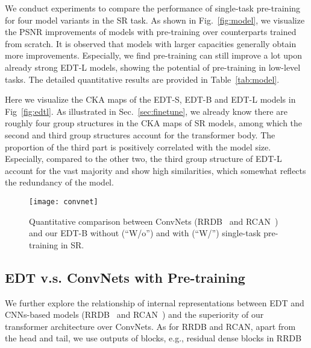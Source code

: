 \documentclass[runningheads]{llncs}
\makeatletter
\newcommand*{\eg}{e.g.\@\xspace}
\makeatother
\begin{document}
We conduct experiments to compare the performance of single-task pre-training for four model variants in the  SR task. As shown in Fig.~\ref{fig:model}, we visualize the PSNR improvements of models with pre-training over counterparts trained from scratch. It is observed that models with larger capacities generally obtain more improvements. Especially, we find pre-training can still improve a lot upon already strong EDT-L models, showing the potential of pre-training in low-level tasks. The detailed quantitative results are provided in Table~\ref{tab:model}.
	
	Here we visualize the CKA maps of the EDT-S, EDT-B and EDT-L models in Fig~\ref{fig:edtl}. As illustrated in Sec.~\ref{sec:finetune}, we already know there are roughly four group structures in the CKA maps of SR models, among which the second and third group structures account for the transformer body. The proportion of the third part is positively correlated with the model size. Especially, compared to the other two, the third group structure of EDT-L account for the vast majority and show high similarities, which somewhat reflects the redundancy of the model.
	


	\begin{figure}[t]
		\begin{center}
			\texttt{[image: convnet]}
		\end{center}
		\vspace{-0.1in}
		\caption{Quantitative comparison between ConvNets (RRDB~\cite{wang2018esrgan} and RCAN~\cite{zhang2018image}) and our EDT-B without (``W/o'') and with (``W/'') single-task pre-training in  SR.}
		\label{fig:convnet}
		\vspace{-0.1in}
	\end{figure}
	
	\subsection{EDT v.s. ConvNets with Pre-training}
	


	We further explore the relationship of internal representations between EDT and CNNs-based models (RRDB~\cite{wang2018esrgan} and RCAN~\cite{zhang2018image}) and the superiority of our transformer architecture over ConvNets. As for RRDB and RCAN, apart from the head and tail, we use outputs of blocks, \eg, residual dense blocks in RRDB
	
\end{document}
